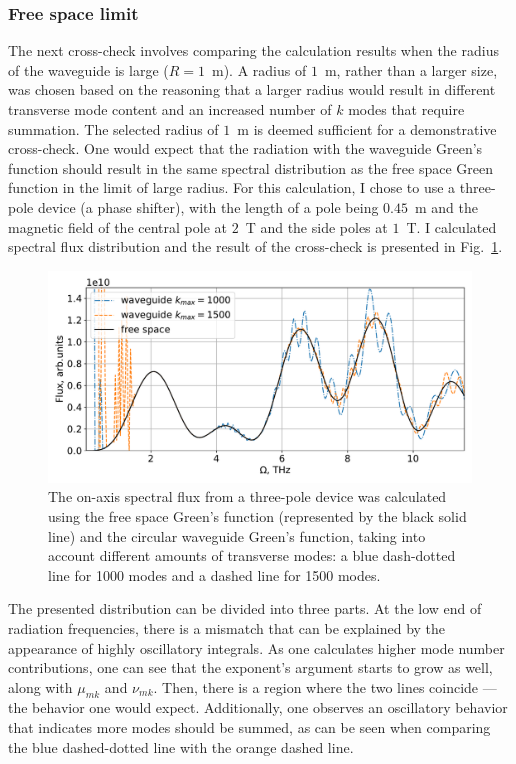 \subsubsection{Free space limit}
    The next cross-check involves comparing the calculation results when the radius of the waveguide is large ($R = 1$~m). A radius of $1$~m, rather than a larger size, was chosen based on the reasoning that a larger radius would result in different transverse mode content and an increased number of $k$ modes that require summation. The selected radius of $1$~m is deemed sufficient for a demonstrative cross-check. One would expect that the radiation with the waveguide Green's function should result in the same spectral distribution as the free space Green function in the limit of large radius. For this calculation, I chose to use a three-pole device (a phase shifter), with the length of a pole being $0.45$~m and the magnetic field of the central pole at $2$~T and the side poles at $1$~T. I calculated spectral flux distribution and the result of the cross-check is presented in Fig.~\ref{Fig:free_space_limit}. 
    \begin{figure}[h]
    	\centering
        \includegraphics[width=0.8\linewidth]{content/images/5_THz_Source/free_space_limit.pdf}
        \captionsetup{justification=centering}
        \caption{The on-axis spectral flux from a three-pole device was calculated using the free space Green's function (represented by the black solid line) and the circular waveguide Green's function, taking into account different amounts of transverse modes: a blue dash-dotted line for 1000 modes and a dashed line for 1500 modes.}
        \label{Fig:free_space_limit}
    \end{figure}
    
    The presented distribution can be divided into three parts. At the low end of radiation frequencies, there is a mismatch that can be explained by the appearance of highly oscillatory integrals. As one calculates higher mode number contributions, one can see that the exponent's argument starts to grow as well, along with $\mu_{mk}$ and $\nu_{mk}$. Then, there is a region where the two lines coincide — the behavior one would expect. Additionally, one observes an oscillatory behavior that indicates more modes should be summed, as can be seen when comparing the blue dashed-dotted line with the orange dashed line.

